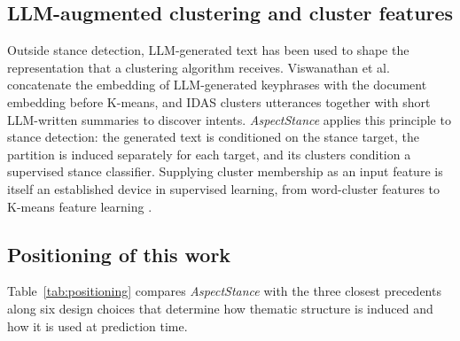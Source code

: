 \documentclass[pdflatex,sn-mathphys-num,iicol]{sn-jnl}%
\begin{document}
\subsection{LLM-augmented clustering and cluster features}\label{subsec26}
Outside stance detection, LLM-generated text has been used to shape the representation that a clustering algorithm receives. Viswanathan et al.~\cite{viswanathan2024fewshot} concatenate the embedding of LLM-generated keyphrases with the document embedding before K-means, and IDAS \cite{deraedt2023idas} clusters utterances together with short LLM-written summaries to discover intents. \textit{AspectStance} applies this principle to stance detection: the generated text is conditioned on the stance target, the partition is induced separately for each target, and its clusters condition a supervised stance classifier. Supplying cluster membership as an input feature is itself an established device in supervised learning, from word-cluster features \cite{turian2010word} to K-means feature learning \cite{coates2012kmeans}.

\subsection{Positioning of this work}\label{subsec25}
Table~\ref{tab:positioning} compares \textit{AspectStance} with the three closest precedents along six design choices that determine how thematic structure is induced and how it is used at prediction time.
\end{document}
